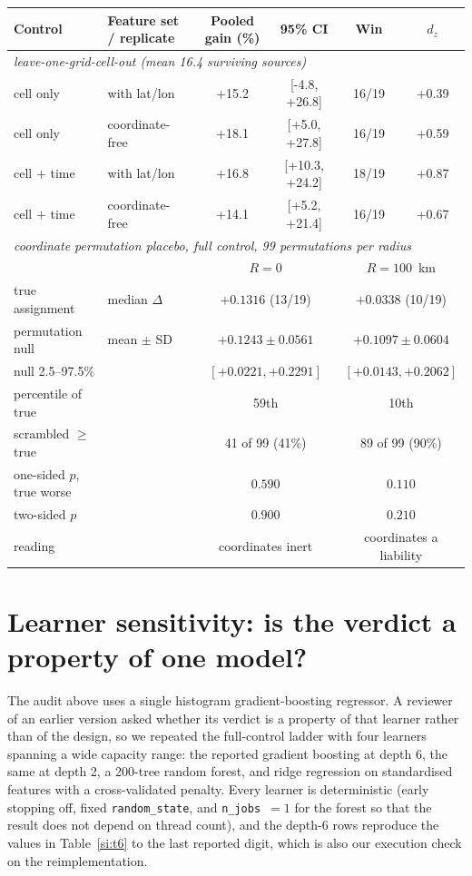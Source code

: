 \documentclass[11pt]{article}
\begin{document}
\begin{table}[htbp]
\begin{tabular}{llcccc}
Control & Feature set / replicate & Pooled gain (\%) & 95\% CI & Win & $d_z$ \\ \midrule
\multicolumn{6}{l}{\textit{leave-one-grid-cell-out (mean 16.4 surviving sources)}} \\
cell only & with lat/lon & +15.2 & [-4.8, +26.8] & 16/19 & +0.39 \\
cell only & coordinate-free & +18.1 & [+5.0, +27.8] & 16/19 & +0.59 \\
cell $+$ time & with lat/lon & +16.8 & [+10.3, +24.2] & 18/19 & +0.87 \\
cell $+$ time & coordinate-free & +14.1 & [+5.2, +21.4] & 16/19 & +0.67 \\
\multicolumn{6}{l}{\textit{coordinate permutation placebo, full control, 99 permutations per radius}} \\
 & & \multicolumn{2}{c}{$R=0$} & \multicolumn{2}{c}{$R=100$~km} \\
true assignment & median $\Delta$ & \multicolumn{2}{c}{$+0.1316$ \; (13/19)} & \multicolumn{2}{c}{$+0.0338$ \; (10/19)} \\
permutation null & mean $\pm$ SD & \multicolumn{2}{c}{$+0.1243\pm0.0561$} & \multicolumn{2}{c}{$+0.1097\pm0.0604$} \\
\quad null 2.5--97.5\% & & \multicolumn{2}{c}{$[+0.0221,+0.2291]$} & \multicolumn{2}{c}{$[+0.0143,+0.2062]$} \\
\quad percentile of true & & \multicolumn{2}{c}{59th} & \multicolumn{2}{c}{10th} \\
\quad scrambled $\geq$ true & & \multicolumn{2}{c}{41 of 99 (41\%)} & \multicolumn{2}{c}{89 of 99 (90\%)} \\
\quad one-sided $p$, true worse & & \multicolumn{2}{c}{$0.590$} & \multicolumn{2}{c}{$0.110$} \\
\quad two-sided $p$ & & \multicolumn{2}{c}{$0.900$} & \multicolumn{2}{c}{$0.210$} \\
\quad reading & & \multicolumn{2}{c}{coordinates inert} & \multicolumn{2}{c}{coordinates a liability} \\
\bottomrule\end{tabular}\end{table}

\section{Learner sensitivity: is the verdict a property of one model?}
The audit above uses a single histogram gradient-boosting regressor. A reviewer of an
earlier version asked whether its verdict is a property of that learner rather than of the
design, so we repeated the full-control ladder with four learners spanning a wide capacity
range: the reported gradient boosting at depth 6, the same at depth 2, a 200-tree random
forest, and ridge regression on standardised features with a cross-validated penalty.
Every learner is deterministic (early stopping off, fixed \texttt{random\_state}, and
\texttt{n\_jobs}~$=1$ for the forest so that the result does not depend on thread count),
and the depth-6 rows reproduce the values in Table~\ref{si:t6} to the last reported digit, which is
also our execution check on the reimplementation.
\end{document}
